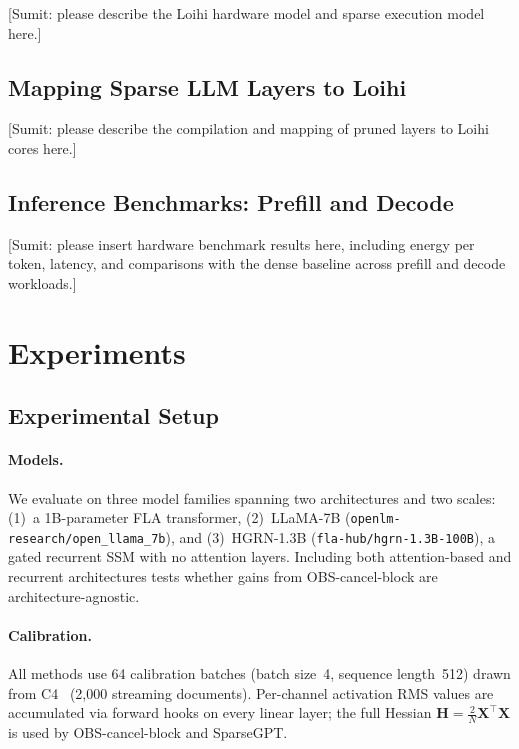 \documentclass{article}
\begin{document}
[Sumit: please describe the Loihi hardware model and sparse execution model here.]

\subsection{Mapping Sparse LLM Layers to Loihi}

[Sumit: please describe the compilation and mapping of pruned layers to Loihi cores here.]

\subsection{Inference Benchmarks: Prefill and Decode}

[Sumit: please insert hardware benchmark results here, including energy per token, latency, and comparisons with the dense baseline across prefill and decode workloads.]


\section{Experiments}
\label{sec:experiments}

\subsection{Experimental Setup}

\paragraph{Models.}
We evaluate on three model families spanning two architectures and two scales:
(1)~a 1B-parameter FLA transformer, (2)~LLaMA-7B
\citep{touvron2023llama} (\texttt{openlm-research/open\_llama\_7b}), and
(3)~HGRN-1.3B \citep{qin2023hierarchically}
(\texttt{fla-hub/hgrn-1.3B-100B}), a gated recurrent SSM with no attention
layers. Including both attention-based and recurrent architectures tests
whether gains from OBS-cancel-block are architecture-agnostic.

\paragraph{Calibration.}
All methods use 64 calibration batches (batch size~4, sequence length~512)
drawn from C4~\citep{raffel2020exploring} (2{,}000 streaming documents).
Per-channel activation RMS values are accumulated via forward hooks on every
linear layer; the full Hessian $\mathbf{H} = \frac{2}{N}\mathbf{X}^\top
\mathbf{X}$ is used by OBS-cancel-block and SparseGPT.
\end{document}
